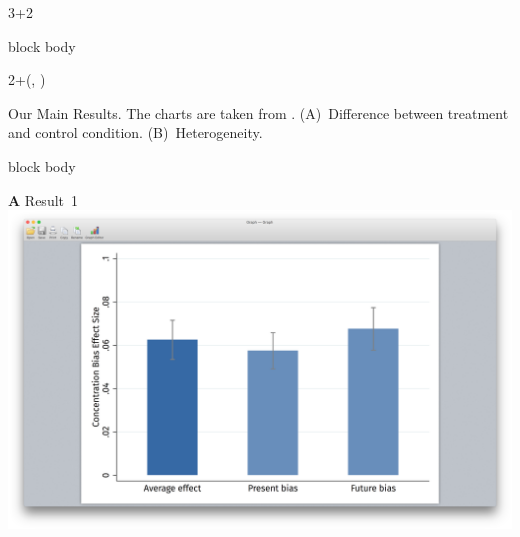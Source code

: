 \documentclass{beamer}
\newlength{\blockTwo}
\begin{document}
\begin{frame}[t]
\begin{textblock*}{3\colwidth+2\colsep}
\begin{alertblock}
\begin{minipage}{0.475\textwidth}
\begin{beamercolorbox}[ht=29cm, center]{block body}
		\end{beamercolorbox}
	\end{minipage}
	\vspace{10pt}
\end{alertblock}

\end{textblock*}




\begin{textblock*}{2\colwidth+\colsep}(\leftmargin, \blockTwo)

\begin{alertblock}{%
	\begin{minipage}[b]{55pt}
		\RaggedRight
		\noindent\hspace{-10pt}
	\end{minipage}%
	\begin{minipage}[b]{2\colwidth+\colsep-125pt}
		Our Main Results.\;
		{\mdseries The charts are taken from \cite{Dertwinkel-Kalt2017}.}\;
		(A)~{\mdseries Difference between treatment and control condition.}\;
		(B)~{\mdseries Heterogeneity.}
	\end{minipage}%
}
\begin{beamercolorbox}[ht=8.0in, center]{block body}
	\begin{minipage}[t]{0.46\textwidth}
		\Large\textbf{A} \textcolor{SpotColor}{\hspace{3.75in} {\firasemibold\small Result~1}} \\[15pt]
		\includegraphics[width=9.13in, trim={3.75in 1.75in 3.75in 2in}, clip]
			{1_Example_Content/Images/average_pb_fb.png}
	\end{minipage}
	\hspace{20pt}

\end{beamercolorbox}
\end{alertblock}
\end{textblock*}
\end{frame}
\end{document}
